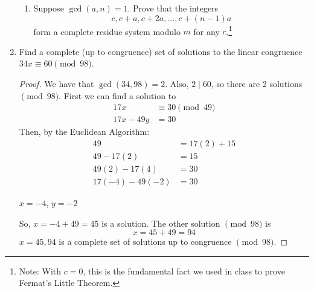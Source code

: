 \documentclass[11pt]{article}
\theoremstyle{definition}
\begin{document}
\begin{enumerate}
\begin{enumerate}
        \item Suppose $\gcd(a,n)=1$. Prove that the integers $$c,c+a,c+2a,\dots,c+(n-1)a$$ form a complete residue system modulo $m$ for any $c$.\footnote{Note: With $c=0$, this is the fundamental fact we used in class to prove Fermat's Little Theorem.}
    \end{enumerate}
    \item Find a complete (up to congruence) set of solutions to the linear congruence $34x\equiv 60 \pmod{98}$.
    \begin{proof}
        We have that $\gcd(34,98)=2$. Also, $2\mid 60$, so there are 2 solutions $\pmod{98}$.
        First we can find a solution to
        \begin{align*}
            17x &\equiv 30\pmod{49} \\
            17x - 49y &= 30
        \end{align*}
        Then, by the Euclidean Algorithm:
        \begin{align*}
            49 &= 17(2) + 15 \\
            49 - 17(2) &= 15 \\
            49(2) - 17(4) &= 30 \\
            17(-4) - 49(-2) &= 30
        \end{align*}
        \begin{center}
            $x=-4$, $y=-2$
        \end{center}
        So, $x=-4+49=45$ is a solution. The other solution $\pmod{98}$ is 
        \[ x=45+49=94 \]
        $x=45,94$ is a complete set of solutions up to congruence $\pmod{98}$.
    \end{proof}


\end{enumerate}
\end{document}
